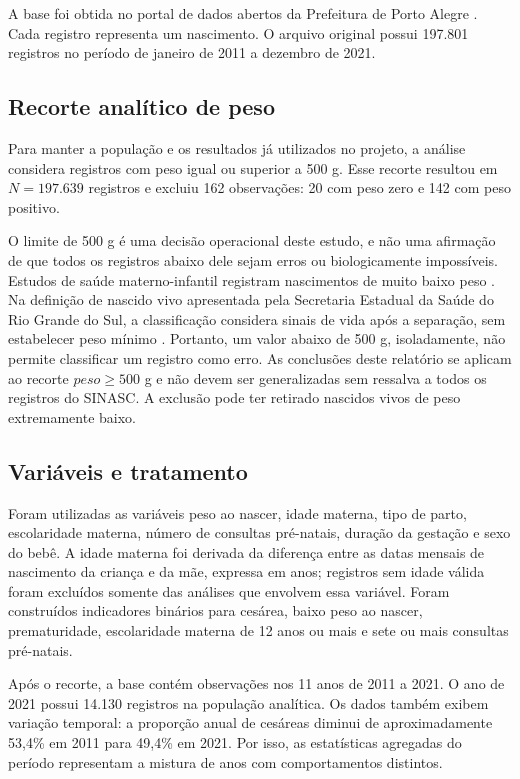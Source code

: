 \documentclass[12pt,a4paper]{article}
\begin{document}
A base foi obtida no portal de dados abertos da Prefeitura de Porto Alegre \cite{sinascpoa}. Cada registro representa um nascimento. O arquivo original possui 197.801 registros no período de janeiro de 2011 a dezembro de 2021.

\subsection{Recorte analítico de peso}

Para manter a população e os resultados já utilizados no projeto, a análise considera registros com peso igual ou superior a 500 g. Esse recorte resultou em \(N=197.639\) registros e excluiu 162 observações: 20 com peso zero e 142 com peso positivo.

O limite de 500 g é uma decisão operacional deste estudo, e não uma afirmação de que todos os registros abaixo dele sejam erros ou biologicamente impossíveis. Estudos de saúde materno-infantil registram nascimentos de muito baixo peso \cite{agranonik}. Na definição de nascido vivo apresentada pela Secretaria Estadual da Saúde do Rio Grande do Sul, a classificação considera sinais de vida após a separação, sem estabelecer peso mínimo \cite[p.~3]{grassi}. Portanto, um valor abaixo de 500 g, isoladamente, não permite classificar um registro como erro. As conclusões deste relatório se aplicam ao recorte \(peso \geq 500\) g e não devem ser generalizadas sem ressalva a todos os registros do SINASC. A exclusão pode ter retirado nascidos vivos de peso extremamente baixo.

\subsection{Variáveis e tratamento}

Foram utilizadas as variáveis peso ao nascer, idade materna, tipo de parto, escolaridade materna, número de consultas pré-natais, duração da gestação e sexo do bebê. A idade materna foi derivada da diferença entre as datas mensais de nascimento da criança e da mãe, expressa em anos; registros sem idade válida foram excluídos somente das análises que envolvem essa variável. Foram construídos indicadores binários para cesárea, baixo peso ao nascer, prematuridade, escolaridade materna de 12 anos ou mais e sete ou mais consultas pré-natais.

Após o recorte, a base contém observações nos 11 anos de 2011 a 2021. O ano de 2021 possui 14.130 registros na população analítica. Os dados também exibem variação temporal: a proporção anual de cesáreas diminui de aproximadamente 53,4\% em 2011 para 49,4\% em 2021. Por isso, as estatísticas agregadas do período representam a mistura de anos com comportamentos distintos.
\end{document}

